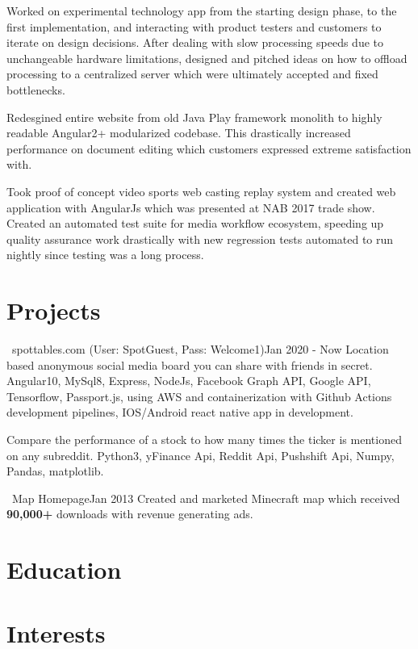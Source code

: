 \documentclass{my_resume}
\begin{document}
\workitemstwo
{Worked on experimental technology app from the starting design phase, to the first implementation, and interacting
with product testers and customers to iterate on design decisions.}
{After dealing with slow processing speeds due to unchangeable hardware limitations, designed and pitched ideas on how to offload
processing to a centralized server which were ultimately accepted and fixed bottlenecks.}

\workitemsone
{Redesgined entire website from old Java Play framework monolith to highly readable Angular2+ modularized codebase. This drastically increased performance
 on document editing which customers expressed extreme satisfaction with.}

\workitemstwo
{Took proof of concept video sports web casting replay system and created web application with AngularJs
 which was presented at NAB 2017 trade show.}
{Created an automated test suite for media workflow ecosystem, speeding up quality assurance work drastically with new regression tests
 automated to run nightly since testing was a long process.}

\section{Projects}

{\faChrome~spottables.com (User: SpotGuest, Pass: Welcome1)}{Jan 2020 - Now}
\projectitem
{Location based anonymous social media board you can share with friends in secret.}
{Angular10, MySql8, Express, NodeJs, Facebook Graph API, Google API, Tensorflow, Passport.js,
  using AWS and containerization with Github Actions development pipelines, IOS/Android react native app in development.}

\projectitem
{Compare the performance of a stock to how many times the ticker is mentioned on any subreddit.}
{Python3, yFinance Api, Reddit Api, Pushshift Api, Numpy, Pandas, matplotlib.}

{\faChrome~Map Homepage}{Jan 2013}
\projectitemone
{Created and marketed Minecraft map which received \textbf{90,000+} downloads with revenue generating ads.}

\section{Education}

\section{Interests}
\end{document}
